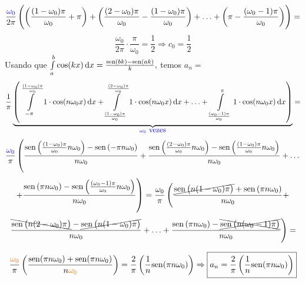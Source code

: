 \documentclass[11pt,twoside,a4paper]{book}
\begin{document}
\[
\frac{\textcolor{blue}{\omega_0}}{2 \pi} \left( \left( \frac{(1 - \omega_0) \pi}{\omega_0} + \pi \right) + \left( \frac{(2 - \omega_0) \pi}{\omega_0} - \frac{(1 - \omega_0) \pi}{\omega_0} \right) + \ldots +  \left( \pi - \frac{(\omega_0 - 1) \pi}{\omega_0}  \right)  \right) = 
\]
\[
\frac{\omega_0}{2 \pi} \cdot \frac{\pi}{\omega_0} = \frac{1}{2} \Rightarrow \boxed{c_0 = \frac{1}{2}}
\]
Usando que $\int\limits_a^b \cos(kx) \dif x = \frac{\sen(bk) - \sen(ak)}{k},$ temos $a_n=$
\[
\frac{1}{\pi} \underbrace{\left(\int\limits_{-\pi}^{\frac{(1 - \omega_0) \pi}{\omega_0}} 1\cdot \cos(n \omega_0 x) \dif {x} + \int\limits_{\frac{(1 - \omega_0) \pi}{\omega_0}}^{\frac{(2 - \omega_0) \pi}{\omega_0}} 1 \cdot\cos(n \omega_0 x) \dif {x} + \ldots + \int\limits_{\frac{(\omega_0 - 1) \pi}{\omega_0}}^{\pi} 1 \cdot \cos(n \omega_0 x) \dif {x} \right)}_{\textcolor{blue}{\omega_0 \ \mbox{vezes} } } =
\]
\[
\frac{\textcolor{blue}{\omega_0}}{\pi} \left( \frac{{\rm sen}\left(\frac{(1 - \omega_0) \pi}{\omega_0}  n \omega_0\right) - {\rm sen}\left(- \pi  n \omega_0\right)}{n \omega_0}  +  
\frac{{\rm sen}\left(\frac{(2 - \omega_0) \pi}{\omega_0}  n \omega_0\right) - {\rm sen}\left(\frac{(1 - \omega_0) \pi}{\omega_0}   n \omega_0\right)}{n \omega_0}  + \ldots \right.\]\[\left. + \frac{{\rm sen}\left(\pi  n \omega_0\right) - {\rm sen}\left(\frac{(\omega_0 - 1) \pi}{\omega_0}   n \omega_0\right)}{n \omega_0}    \right) =
\frac{\omega_0}{\pi} \left( \frac{ \cancel{{\rm sen}\left(n(1 - \omega_0) \pi \right)} + {\rm sen}\left( \pi  n \omega_0\right)}{n \omega_0}  +  \right.\]\[ \left.
\frac{\bcancel{{\rm sen}\left(  n(2 - \omega_0) \pi \right)} - \cancel{{\rm sen}\left(n(1 - \omega_0) \pi\right)}}{n \omega_0}  + \ldots + \frac{{\rm sen}\left(\pi  n \omega_0\right) - \xcancel{{\rm sen}\left(n(\omega_0 - 1) \pi  \right)}}{n \omega_0} \right) =
\]

\[
\frac{\textcolor{Laranja}{\omega_0}}{\pi} \left( \frac{\sen( \pi n \omega_0) + \sen( \pi n \omega_0) }{n \textcolor{Laranja}{\omega_0} } \right) = \frac{2}{\pi} \left(\frac{1}{n} \sen( \pi n \omega_0)\right) \Rightarrow \boxed{ a_n = \frac{2}{\pi} \left(\frac{1}{n} \sen( \pi n \omega_0)\right) }
\]
\end{document}
